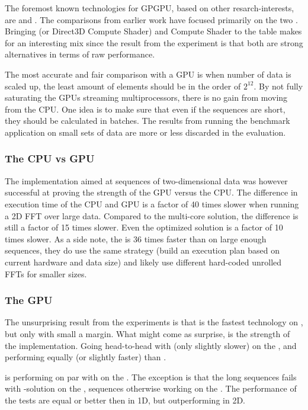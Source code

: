 The foremost known technologies for GPGPU, based on other resarch-interests, are {\CU} and {\OCL}. The comparisons from earlier work have focused primarily on the two \cite{fang2011comprehensive, park2011design, su2012overview}. Bringing {\DX} (or Direct3D Compute Shader) and {\GL} Compute Shader to the table makes for an interesting mix since the result from the experiment is that both are strong alternatives in terms of raw performance.

The most accurate and fair comparison with a GPU is when number of data is scaled up, the least amount of elements should be in the order of $2^{12}$. By not fully saturating the GPUs streaming multiprocessors, there is no gain from moving from the CPU. One idea is to make sure that even if the sequences are short, they should be calculated in batches. The results from running the benchmark application on small sets of data are more or less discarded in the evaluation.

\subsubsection{The CPU vs GPU}

The implementation aimed at sequences of two-dimensional data was however successful at proving the strength of the GPU versus the CPU. The difference in execution time of the CPU and GPU is a factor of 40 times slower when running a 2D FFT over large data. Compared to the multi-core {\OMP} solution, the difference is still a factor of 15 times slower. Even the optimized {\FFTW} solution is a factor of 10 times slower. As a side note, the {\CUFFT} is 36 times faster than {\FFTW} on large enough sequences, they do use the same strategy (build an execution plan based on current hardware and data size) and likely use different hard-coded unrolled FFTs for smaller sizes.

\subsubsection{The GPU}

The unsurprising result from the experiments is that {\CU} is the fastest technology on {\NVCARD}, but only with small a margin. What might come as surprise, is the strength of the {\DX} implementation. Going head-to-head with {\CU} (only slightly slower) on the {\NVCARD}, and performing equally (or slightly faster) than {\OCL}.

{\GL} is performing on par with {\DX} on the {\AMDCARD}. The exception is that the long sequences fails with {\GL}-solution on the {\AMDCARD}, sequences otherwise working on the {\NVCARD}. The performance of the {\GL} tests are equal or better then {\OCL} in 1D, but outperforming {\OCL} in 2D.

